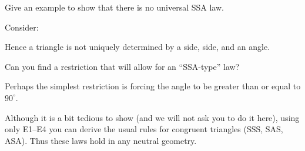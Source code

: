 \documentclass{ximera}
\begin{document}
\begin{problem}
Give an example to show that there is no universal SSA law.

\begin{freeResponse}
Consider:
\begin{image}
\end{image}
Hence a triangle is not uniquely determined by a side, side, and an angle. 
\end{freeResponse}

Can you find a restriction that will allow for an ``SSA-type'' law?
\begin{freeResponse}
Perhaps the simplest restriction is forcing the angle to be greater
than or equal to $90^\circ$.
\end{freeResponse}
\end{problem}

Although it is a bit tedious to show (and we will not ask you to do it
here), using only E1--E4 you can derive the usual rules for congruent
triangles (SSS, SAS, ASA). Thus these laws hold in any neutral
geometry.
\end{document}
